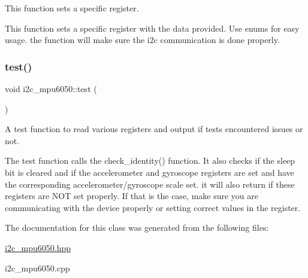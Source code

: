 This function sets a specific register. 

This function sets a specific register with the data provided. Use enums for easy usage. the function will make sure the i2c communication is done properly. \mbox{\label{classi2c__mpu6050_a184e58b90e30780437d4dd3b0a1f2012}} 
\subsubsection{\texorpdfstring{test()}{test()}}
{\footnotesize\ttfamily void i2c\+\_\+mpu6050\+::test (\begin{DoxyParamCaption}{ }\end{DoxyParamCaption})}



A test function to read various registers and output if tests encountered issues or not. 

The test function calls the check\+\_\+identity() function. It also checks if the sleep bit is cleared and if the accelerometer and gyroscope registers are set and have the corresponding accelerometer/gyroscope scale set. it will also return if these registers are N\+OT set properly. If that is the case, make sure you are communicating with the device properly or setting correct values in the register.  

The documentation for this class was generated from the following files\+:\begin{DoxyCompactItemize}
\item 
\mbox{\hyperlink{i2c__mpu6050_8hpp}{i2c\+\_\+mpu6050.\+hpp}}\item 
i2c\+\_\+mpu6050.\+cpp\end{DoxyCompactItemize}
